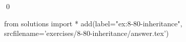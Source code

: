 
\begin{ex}
  \label{ex:8-80-inheritance}
  
  \qed
\end{ex}
\begin{python0}
from solutions import *
add(label="ex:8-80-inheritance",
    srcfilename='exercises/8-80-inheritance/answer.tex')
\end{python0}
